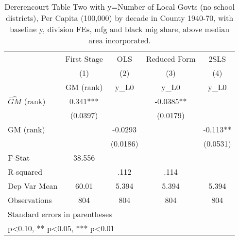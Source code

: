 \begin{table}[htbp]\centering
\def\sym#1{\ifmmode^{#1}\else\(^{#1}\)\fi}
\caption{Dererencourt Table Two with y=Number of Local Govts (no school districts), Per Capita (100,000) by decade in County 1940-70, with baseline y, division FEs, mfg and black mig share, above median area incorporated.}
\begin{tabular}{l*{4}{c}}
\toprule
                    & First Stage   &         OLS   &Reduced Form   &        2SLS   \\
                    &\multicolumn{1}{c}{(1)}&\multicolumn{1}{c}{(2)}&\multicolumn{1}{c}{(3)}&\multicolumn{1}{c}{(4)}\\
                    &\multicolumn{1}{c}{GM  (rank)}&\multicolumn{1}{c}{y\_L0}&\multicolumn{1}{c}{y\_L0}&\multicolumn{1}{c}{y\_L0}\\
\midrule
$\hat{GM}$ (rank)   &       0.341***&               &     -0.0385** &               \\
                    &    (0.0397)   &               &    (0.0179)   &               \\
\addlinespace
GM  (rank)          &               &     -0.0293   &               &      -0.113** \\
                    &               &    (0.0186)   &               &    (0.0531)   \\
\midrule
F-Stat              &      38.556   &               &               &               \\
R-squared           &               &        .112   &        .114   &               \\
Dep Var Mean        &       60.01   &       5.394   &       5.394   &       5.394   \\
Observations        &         804   &         804   &         804   &         804   \\
\bottomrule
\multicolumn{5}{l}{\footnotesize Standard errors in parentheses}\\
\multicolumn{5}{l}{\footnotesize * p<0.10, ** p<0.05, *** p<0.01}\\
\end{tabular}
\end{table}
